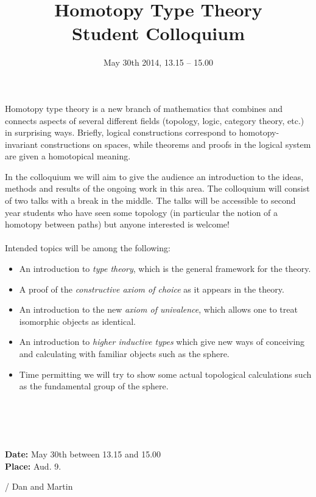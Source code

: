 \documentclass[11pt,a4paper,oneside,final]{article} %
\title{Homotopy Type Theory \\ \Large{Student Colloquium}}
\date{May 30th  2014,  13.15 -- 15.00 }
\theoremstyle{plain}
\theoremstyle{definition}
\theoremstyle{remark}
\theoremstyle{remark}
\theoremstyle{thm}
\theoremstyle{remark}
\newcommand{\0}{{[0]}}
\newcommand{\1}{{[1]}}
\begin{document}
\maketitle




\noindent Homotopy type theory is a new branch of mathematics that combines and connects aspects of several different fields (topology, logic, category theory, etc.) in surprising ways. Briefly, logical constructions correspond to homotopy-invariant constructions on spaces, while theorems and proofs in the logical system are given a homotopical meaning. 


In the colloquium we will aim to give the audience an introduction to the ideas, methods and results of the ongoing work in this area. 
The colloquium will consist of two talks with a break in the middle. The talks will be accessible to second year students who have seen some topology (in particular the notion of a homotopy between paths) but anyone interested is welcome!
\\
\\
\noindent Intended topics will be among the following:
\begin{itemize}[noitemsep]
\item An introduction to \emph{type theory}, which is the general framework for the theory.
\item A proof of the \emph{constructive axiom of choice} as it appears in the theory. 
\item An introduction to the new \emph{axiom of univalence}, which allows one to treat isomorphic objects as identical.
\item An introduction to \emph{higher inductive types} which give new ways of conceiving and calculating with familiar objects such as the sphere.
\item Time permitting we will try to show some actual topological calculations such as the fundamental group of the sphere.
\end{itemize}
\
\\
\\
\\
\\
\textbf{Date:} May 30th between 13.15 and 15.00\\
\textbf{Place:} Aud. 9.



\flushright / Dan and Martin
\end{document}
